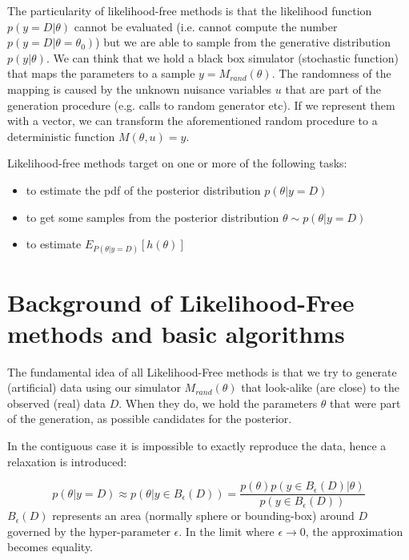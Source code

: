 \documentclass{article}
\begin{document}
The particularity of likelihood-free methods is that the likelihood function $p(y=D|\theta)$ cannot be evaluated (i.e. cannot compute the number $p(y=D|\theta=\theta_0)$) but we are able to sample from the generative distribution $p(y|\theta)$. We can think that we hold a black box simulator (stochastic function) that maps the parameters to a sample $y = M_{rand}(\theta)$. The randomness of the mapping is caused by the unknown nuisance variables $u$ that are part of the generation procedure (e.g. calls to random generator etc). If we represent them with a vector, we can transform the aforementioned random procedure to a deterministic function $M(\theta, u) = y$.  


Likelihood-free methods target on one or more of the following tasks:

\begin{itemize}
  \item to estimate the pdf of the posterior distribution $p(\theta|y=D)$
  \item to get some samples from the posterior distribution $\theta \sim p(\theta|y=D)$
  \item to estimate $E_{P(\theta|y=D)}[h(\theta)]$
 \end{itemize}



\section{Background of Likelihood-Free methods and basic algorithms}

The fundamental idea of all Likelihood-Free methods is that we try to generate (artificial) data using our simulator $M_{rand}(\theta)$ that look-alike (are close) to the observed (real) data $D$. When they do, we hold the parameters $\theta$ that were part of the generation, as possible candidates for the posterior.

In the contiguous case it is impossible to exactly reproduce the data, hence a relaxation is introduced:

\begin{equation} \label{eq:post_approx}
    p(\theta|y=D) \approx p(\theta|y \in B_\epsilon(D)) = \frac{p(\theta) p(y \in B_\epsilon(D)|\theta)}{p(y \in B_\epsilon(D))}
\end{equation}
%
$B_\epsilon(D)$ represents an area (normally sphere or bounding-box) around $D$ governed by the hyper-parameter $\epsilon$. In the limit where $\epsilon \rightarrow 0$, the approximation becomes equality.
\end{document}
